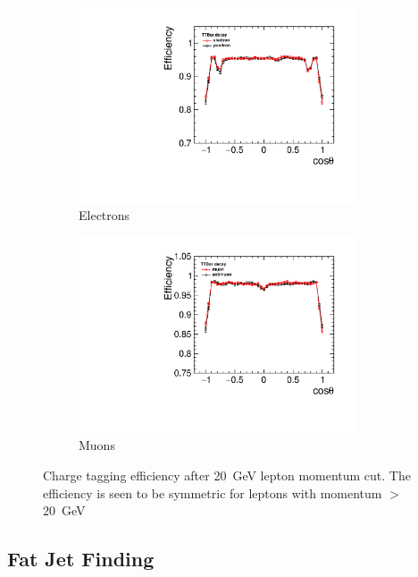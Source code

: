 \begin{figure}
  \centering
  \begin{subfigure}{.5\textwidth}
    \centering
    \includegraphics[width=0.9\textwidth]{TopAnalysis/figures/ElectronEfficiencys_20GeVMCCut.pdf}
    \caption[Charge Tagging Efficiency]{Electrons}
  \end{subfigure}%
  \begin{subfigure}{.5\textwidth}
    \centering
    \includegraphics[width=0.9\textwidth]{TopAnalysis/figures/MuonEfficiencys_20GeVMCCut.pdf}
    \caption[Charge Tagging Efficiency]{Muons}
  \end{subfigure}
  \caption[Charge Tagging Efficiency After 20GeV Lepton Momentum Cut]{Charge tagging efficiency after 20~GeV lepton momentum cut. The efficiency is seen to be symmetric for leptons with momentum $>$ 20~GeV}
  \label{fig:effienciesWithCuts}
\end{figure}


\subsection{Fat Jet Finding}

